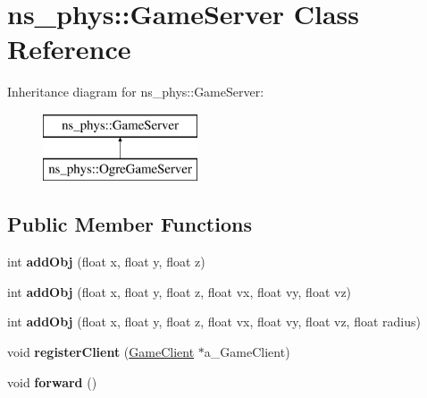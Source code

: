 \hypertarget{classns__phys_1_1_game_server}{}\section{ns\+\_\+phys\+:\+:Game\+Server Class Reference}
\label{classns__phys_1_1_game_server}
Inheritance diagram for ns\+\_\+phys\+:\+:Game\+Server\+:\begin{figure}[H]
\begin{center}
\leavevmode
\includegraphics[height=2.000000cm]{classns__phys_1_1_game_server}
\end{center}
\end{figure}
\subsection*{Public Member Functions}
\begin{DoxyCompactItemize}
\item 
int {\bfseries add\+Obj} (float x, float y, float z)\hypertarget{classns__phys_1_1_game_server_ab23dcbda02561402c4c8747e02b7b4e4}{}\label{classns__phys_1_1_game_server_ab23dcbda02561402c4c8747e02b7b4e4}

\item 
int {\bfseries add\+Obj} (float x, float y, float z, float vx, float vy, float vz)\hypertarget{classns__phys_1_1_game_server_ac6225ea25f1a9104791d3a5a843a4a86}{}\label{classns__phys_1_1_game_server_ac6225ea25f1a9104791d3a5a843a4a86}

\item 
int {\bfseries add\+Obj} (float x, float y, float z, float vx, float vy, float vz, float radius)\hypertarget{classns__phys_1_1_game_server_aa578888bf3365b466a42dde413891f72}{}\label{classns__phys_1_1_game_server_aa578888bf3365b466a42dde413891f72}

\item 
void {\bfseries register\+Client} (\hyperlink{classns__phys_1_1_game_client}{Game\+Client} $\ast$a\+\_\+\+Game\+Client)\hypertarget{classns__phys_1_1_game_server_aedaa4d2d46a4fcd1aa358dbcae6877af}{}\label{classns__phys_1_1_game_server_aedaa4d2d46a4fcd1aa358dbcae6877af}

\item 
void {\bfseries forward} ()\hypertarget{classns__phys_1_1_game_server_acac9c16be7a35c7039d46fae23811c8a}{}\label{classns__phys_1_1_game_server_acac9c16be7a35c7039d46fae23811c8a}

\end{DoxyCompactItemize}
